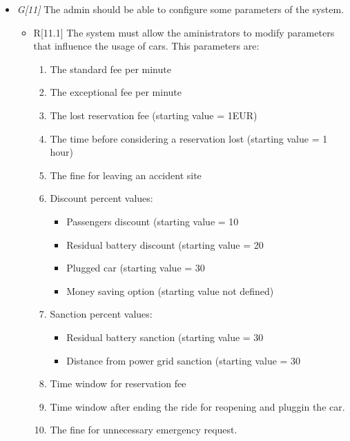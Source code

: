 \begin{itemize}
				\item \textit{G[11]} The admin should be able to configure some parameters of the system.
					\begin{itemize}
						\item R[11.1] The system must allow the aministrators to modify parameters that influence the usage of cars. This parameters are:
							\begin{enumerate}
								\item The standard fee per minute
								\item The exceptional fee per minute
								\item The lost reservation fee (starting value = 1EUR)
								\item The time before considering a reservation lost (starting value = 1 hour)
								\item The fine for leaving an accident site %
								\item Discount percent values:
									\begin{itemize}
										\item Passengers discount (starting value = 10%
										\item Residual battery discount (starting value = 20%
										\item Plugged car (starting value = 30%
										\item Money saving option (starting value not defined)
									\end{itemize}
								\item Sanction percent values:
									\begin{itemize}
										\item Residual battery sanction (starting value = 30%
										\item Distance from power grid sanction (starting value = 30%
									\end{itemize}
								\item Time window for reservation fee
								\item Time window after ending the ride for reopening and pluggin the car.
								\item The fine for unnecessary emergency request.
							\end{enumerate}
					\end{itemize}
\end{itemize}





